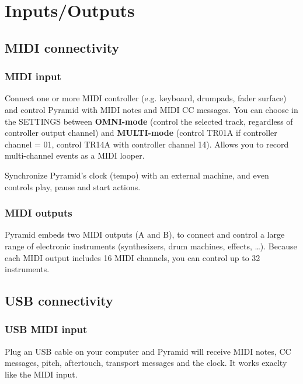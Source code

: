 \section{Inputs/Outputs}

\subsection{MIDI connectivity}

\subsubsection{MIDI input}


Connect one or more MIDI controller (e.g. keyboard, drumpads, fader surface) and control Pyramid with MIDI notes and MIDI CC messages. You can choose in the SETTINGS between \textbf{OMNI-mode} (control the selected track, regardless of controller output channel) and \textbf{MULTI-mode} (control TR01A if controller channel = 01, control TR14A with controller channel 14). Allows you to record multi-channel events as a MIDI looper.

Synchronize Pyramid's clock (tempo) with an external machine, and even controls play, pause and start actions.

\subsubsection{MIDI outputs}


Pyramid embeds two MIDI outputs (A and B), to connect and control a large range of electronic instruments (synthesizers, drum machines, effects, \ldots). Because each MIDI output includes 16 MIDI channels, you can control up to 32 instruments.


\subsection{USB connectivity}

\subsubsection{USB MIDI input}


Plug an USB cable on your computer and Pyramid will receive MIDI notes, CC messages, pitch, aftertouch, transport messages and the clock. It works exaclty like the MIDI input.

